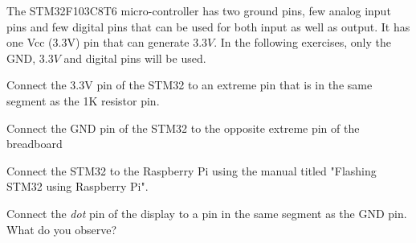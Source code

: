 The STM32F103C8T6 micro-controller has two ground pins, few analog input pins and few digital pins that can be used for both input as well as output. It has one Vcc (3.3V) pin that can generate 3.3$V$.  In the following exercises, only the GND, 3.3$V$ and digital pins will be used.
%
%
\begin{problem}
	Connect the 3.3V pin of the STM32 to an  extreme pin that is in the same segment as the 1K resistor pin. 
	\end{problem}	
\begin{problem}
	Connect the GND pin of the STM32 to the opposite extreme pin of the breadboard
\end{problem}
\begin{problem}
	Connect the STM32 to the Raspberry Pi using the manual titled "Flashing STM32 using Raspberry Pi".
\end{problem}
\begin{problem}
	Connect the {\em dot} pin of the display to a pin in the same segment as the GND pin.  What do you observe?
\end{problem}
